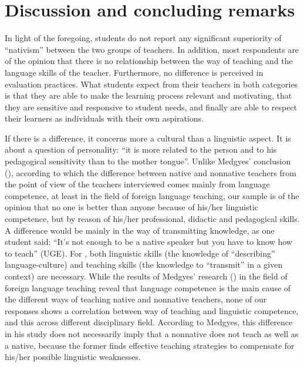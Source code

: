 \documentclass[output=paper]{../langscibook}
\begin{document}
\section{Discussion and concluding remarks}

In light of the foregoing, students do not report any significant superiority of “nativism” between the two groups of teachers. In addition, most respondents are of the opinion that there is no relationship between the way of teaching and the language skills of the teacher. Furthermore, no difference is perceived in evaluation practices. What students expect from their teachers in both categories is that they are able to make the learning process relevant and motivating, that they are sensitive and responsive to student needs, and finally are able to respect their learners as individuals with their own aspirations.

If there is a difference, it concerns more a cultural than a linguistic aspect. It is about a question of personality: “it is more related to the person and to his pedagogical sensitivity than to the mother tongue”. Unlike Medgyes’ conclusion (\citeyear{Medgyes1992,Medgyes1994}), according to which the difference between native and nonnative teachers from the point of view of the teachers interviewed comes mainly from language competence, at least in the field of foreign language teaching, our sample is of the opinion that no one is better than anyone because of his/her linguistic competence, but by reason of his/her professional, didactic and pedagogical skills. A difference would be mainly in the way of transmitting knowledge, as one student said: “It’s not enough to be a native speaker but you have to know how to teach” (UGE). For \citet[104]{Bento2011}, both linguistic skills (the knowledge of “describing” language-culture) and teaching skills (the knowledge to “transmit” in a given context) are necessary. While the results of Medgyes’ research (\citeyear{Medgyes1992,Medgyes1994}) in the field of foreign language teaching reveal that language competence is the main cause of the different ways of teaching native and nonnative teachers, none of our responses shows a correlation between way of teaching and linguistic competence, and this across different disciplinary field. According to Medgyes, this difference in his study does not necessarily imply that a nonnative does not teach as well as a native, because the former finds effective teaching strategies to compensate for his/her possible linguistic weaknesses. 
\end{document}
